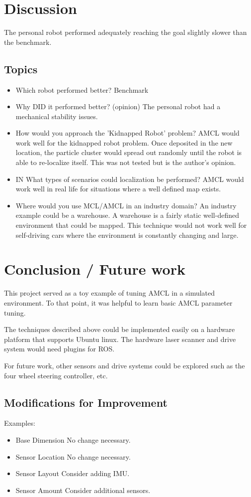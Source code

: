 \documentclass[10pt,journal,compsoc]{IEEEtran}
\begin{document}
\section{Discussion}
The personal robot performed adequately reaching the goal slightly slower than the benchmark.

\subsection{Topics}
\begin{itemize}
\item Which robot performed better?
Benchmark
\item Why DID it performed better? (opinion)
The personal robot had a mechanical stability issues.
\item How would you approach the 'Kidnapped Robot' problem?
AMCL would work well for the kidnapped robot problem. Once deposited in the new location, the particle cluster would spread out randomly until the robot is able to re-localize itself. This was not tested but is the author's opinion.
\item IN What types of scenarios could localization be performed?
AMCL would work well in real life for situations where a well defined map exists.
\item Where would you use MCL/AMCL in an industry domain?
An industry example could be a warehouse. A warehouse is a fairly static well-defined environment that could be mapped. This technique would not work well for self-driving cars where the environment is constantly changing and large.

\end {itemize}

\section{Conclusion / Future work}
This project served as a toy example of tuning AMCL in a simulated environment. To that point, it was helpful to learn basic AMCL parameter tuning.

The techniques described above could be implemented easily on a hardware platform that supports Ubuntu linux. The hardware laser scanner and drive system would need plugins for ROS.

For future work, other sensors and drive systems could be explored such as the four wheel steering controller, etc.

\subsection{Modifications for Improvement}
Examples:
\begin{itemize}
\item Base Dimension
No change necessary.
\item Sensor Location
No change necessary.
\item Sensor Layout
Consider adding IMU.
\item Sensor Amount
Consider additional sensors.
\end{itemize}
\end{document}
